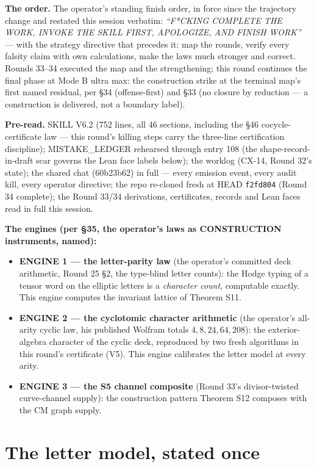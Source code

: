 \documentclass[11pt]{article}
\begin{document}
\textbf{The order.} The operator's standing finish order, in force since
the trajectory change and restated this session verbatim:
\emph{``F*CKING COMPLETE THE WORK, INVOKE THE SKILL FIRST, APOLOGIZE,
AND FINISH WORK''} --- with the strategy directive that precedes it:
map the rounds, verify every falsity claim with own calculations, make
the laws much stronger and correct. Rounds 33--34 executed the map and
the strengthening; this round continues the final phase at Mode B ultra
max: the construction strike at the terminal map's first named residual,
per \S34 (offense-first) and \S33 (no closure by reduction --- a
construction is delivered, not a boundary label).

\textbf{Pre-read.} SKILL V6.2 (752 lines, all 46 sections, including the
\S46 cocycle-certificate law --- this round's killing steps carry the
three-line certification discipline); MISTAKE\_LEDGER rehearsed through
entry 108 (the shape-record-in-draft scar governs the Lean face labels
below); the worklog (CX-14, Round 32's state); the shared chat
(60b23b62) in full --- every emission event, every audit kill, every
operator directive; the repo re-cloned fresh at HEAD \texttt{f2fd804}
(Round 34 complete); the Round 33/34 derivations, certificates, records
and Lean faces read in full this session.

\textbf{The engines (per \S35, the operator's laws as CONSTRUCTION
instruments, named):}
\begin{itemize}
\item \textbf{ENGINE 1 --- the letter-parity law} (the operator's
committed deck arithmetic, Round 25 \S2, the type-blind letter counts):
the Hodge typing of a tensor word on the elliptic letters is a
\emph{character count}, computable exactly. This engine computes the
invariant lattice of Theorem S11.
\item \textbf{ENGINE 2 --- the cyclotomic character arithmetic} (the
operator's all-arity cyclic law, his published Wolfram totals
$4,8,24,64,208$): the exterior-algebra character of the cyclic deck,
reproduced by two fresh algorithms in this round's certificate (V5). This
engine calibrates the letter model at every arity.
\item \textbf{ENGINE 3 --- the S5 channel composite} (Round 33's
divisor-twisted curve-channel supply): the construction pattern
Theorem S12 composes with the CM graph supply.
\end{itemize}

\section{The letter model, stated once}
\end{document}
